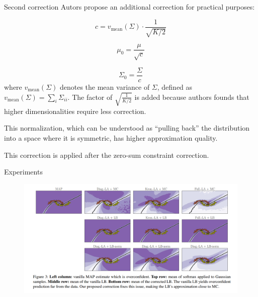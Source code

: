 \documentclass{beamer}
\begin{document}
\begin{frame}{Second correction}
\footnotesize
Autors propose an additional correction for practical purposes:

\[
c = v_{\text{mean}}(\Sigma) \cdot \frac{1}{\sqrt{K/2}}
\]

\[
\mu_0 = \frac{\mu}{\sqrt{c}}
\]

\[
\Sigma_0 = \frac{\Sigma}{c}
\]
where \( v_{\text{mean}}(\Sigma) \) denotes the mean variance of \( \Sigma \), defined as \( v_{\text{mean}}(\Sigma) = \sum_i \Sigma_{ii} \). 
The factor of \( \sqrt{\frac{1}{K/2}} \) is added because authors founds that higher dimensionalities require less correction. 

This normalization, which can be understood as “pulling back” the distribution into a space where it is symmetric, has higher approximation quality. 

This correction is applied after the zero-sum constraint correction.

\end{frame}



\begin{frame}{Experiments }
     \begin{figure}
        \centering
        \includegraphics[width=1.1\textwidth]{figs/experiments.png} %
    \end{figure}
\end{frame}
\end{document}
